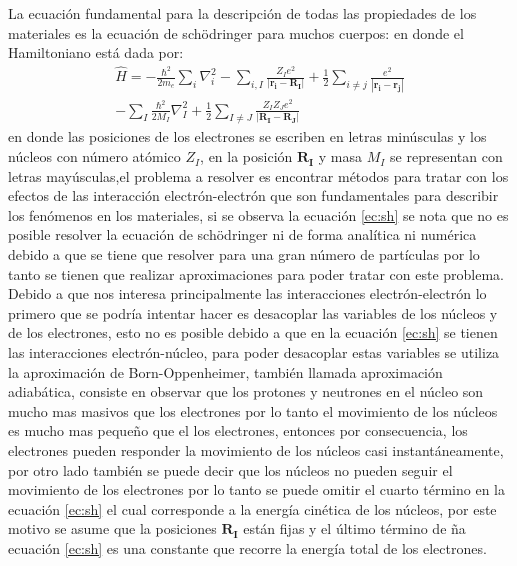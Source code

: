 \documentclass[12pt,a4paper, oneside]{book}
\begin{document}
	La ecuaci\'on fundamental para la descripci\'on de todas las propiedades de los materiales es la ecuaci\'on  de  sch\"odringer para muchos cuerpos: en donde el Hamiltoniano est\'a dada por:
	\begin{multline}
	\hat H = - \frac{\hbar ^2}{2 m_e} \sum_{i} \nabla_{i}^2 - \sum_{i,I} \frac{Z_I e^2}{\vert \pmb{r_i} - \pmb{R_I} \vert}+ \frac{1}{2} \sum_{i \not= j}  \frac{e^2}{|\pmb{r_i} - \pmb{r_j} |}\\
	- \sum_{I} \frac{\hbar^2}{2 M_I} \nabla_I^2 + \frac{1}{2} \sum_{I \not= J} \frac{Z_I Z_J e^2}{|\pmb{R_I}-\pmb{R_J}|}  \label{ec:sh} 
	\end{multline}	
	\newline
	en donde las posiciones de los electrones se escriben en letras min\'usculas y los n\'ucleos con n\'umero at\'omico  $Z_I$, en la posici\'on $\pmb{R_I}$ y masa $M_I$ se representan con letras may\'usculas,el problema a resolver es encontrar m\'etodos para tratar con  los efectos de las interacci\'on  electr\'on-electr\'on que son fundamentales para describir los fenómenos en los materiales, si se observa la ecuaci\'on \ref{ec:sh} se nota que no es posible resolver la ecuaci\'on de sch\"odringer ni de forma anal\'itica ni num\'erica debido a que se tiene que resolver para una gran n\'umero de part\'iculas por lo tanto se tienen que realizar aproximaciones para poder tratar con este problema.
	\newline
	Debido a que nos interesa principalmente las interacciones electr\'on-electr\'on lo primero que se podr\'ia intentar hacer es desacoplar las variables de los n\'ucleos  y de los electrones, esto no es posible debido a que en la ecuaci\'on \ref{ec:sh} se tienen las interacciones electr\'on-n\'ucleo, para poder desacoplar estas variables se utiliza la aproximaci\'on de Born-Oppenheimer, tambi\'en llamada aproximaci\'on adiabática, consiste en observar que los protones y neutrones en el n\'ucleo son mucho mas masivos que los electrones por lo tanto el movimiento de los n\'ucleos es mucho mas pequeño que el  los electrones, entonces por consecuencia, los electrones pueden  responder la movimiento de los n\'ucleos casi instant\'aneamente, por otro lado tambi\'en se puede decir que los n\'ucleos no pueden seguir el movimiento de los electrones por lo tanto se puede omitir el cuarto t\'ermino en la ecuaci\'on \ref{ec:sh} el cual corresponde a la energ\'ia cin\'etica de los n\'ucleos, por este motivo se asume que la posiciones $\pmb{R_I}$ est\'an fijas y el \'ultimo t\'ermino de ña ecuaci\'on \ref{ec:sh} es una constante que recorre la energ\'ia total de los electrones.
\end{document}
